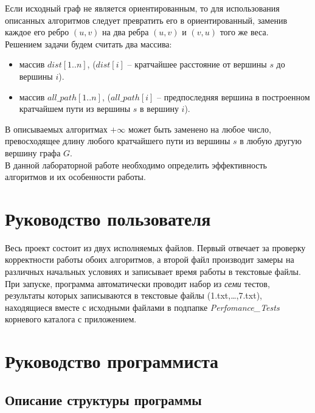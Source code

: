 \begin{text}
	Если исходный граф не является ориентированным, то для использования описанных алгоритмов следует превратить его в ориентированный, заменив каждое его ребро $(u,v)$ на два ребра $(u,v)$ и $(v,u)$ того же веса. \\
	
	Решением задачи будем считать два массива:
	\begin{itemize}
	\item массив $dist[1..n]$, ($dist[i]$ – кратчайшее расстояние от вершины $s$ до вершины $i$).
	\item массив $all\_path[1..n]$, ($all\_path[i]$ – предпоследняя вершина в построенном кратчайшем пути из вершины $s$ в вершину $i$).
	\end{itemize}
	
	В описываемых алгоритмах $+\infty$ может быть заменено на любое число, превосходящее длину любого кратчайшего пути из вершины $s$ в любую другую вершину графа $G$.\\
	
	В данной лабораторной работе необходимо определить эффективность алгоритмов и их особенности работы.

\newpage
\section{Руководство пользователя}
	Весь проект состоит из двух исполняемых файлов. Первый отвечает за проверку корректности работы обоих алгоритмов, а второй файл производит замеры на различных начальных условиях и записывает время работы в текстовые файлы.\\
	
	При запуске, программа автоматически проводит набор из \textit{семи} тестов, результаты которых записываются в текстовые файлы (1.txt,\ldots,7.txt), находящиеся вместе с исходными файлами в подпапке \textit{Perfomance\_Tests} корневого каталога с приложением.
\newpage

\section{Руководство программиста}
\subsection{Описание структуры программы}


\end{text}

